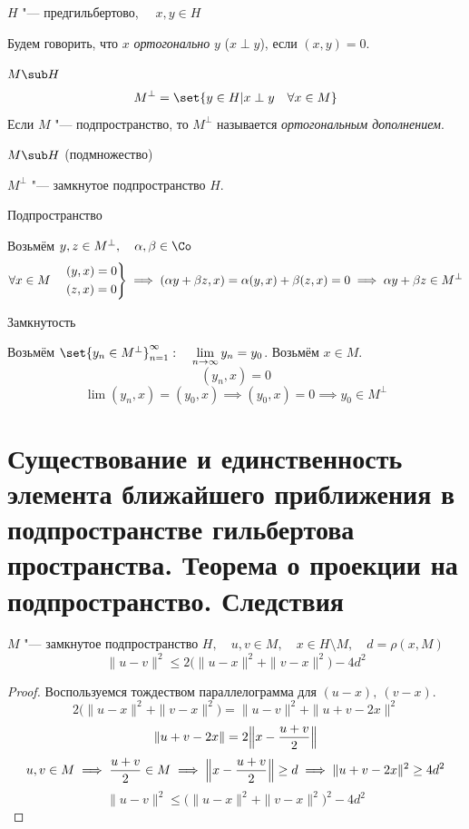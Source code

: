 \begin{definition}
	$ H $ "--- предгильбертово, $ \quad x, y \in H $

	Будем говорить, что $ x $ \emph{ортогонально} $ y $ ($ x \perp y $), если $ (x, y) = 0 $.
\end{definition}

\begin{definition}
	$ M \sub H $
	$$ M^\perp = \set{y \in H | x \perp y \quad \forall x \in M} $$
	Если $ M $ "--- подпространство, то $ M^\perp $ называется \emph{ортогональным
	дополнением}.
\end{definition}

\begin{statement}
	$ M \sub H $ (подмножество)

	$ M^\perp $ "--- замкнутое подпространство $ H $.
\end{statement}

\begin{iproof}
\item Подпространство

	Возьмём $ y, z \in M^\perp, \quad \alpha, \beta \in \Co $
	$$ \forall x \in M \quad
	\begin{rcases}
		(y, x) = 0 \\
		(z, x) = 0
	\end{rcases} \implies (\alpha y + \beta z, x) = \alpha(y, x) + \beta(z, x) = 0 \implies
	\alpha y + \beta z \in M^\perp $$
\item Замкнутость

	Возьмём $ \set{y_n \in M^\perp}_{n = 1}^\infty : \quad \lim\limits_{n \to \infty} y_n = y_0 $.
	Возьмём $ x \in M $.
	$$ (y_n, x) = 0 $$
	$$ \lim (y_n, x) = (y_0, x) \implies
	(y_0, x) = 0 \implies
	y_0 \in M^\perp $$
\end{iproof}

\section{Существование и единственность элемента ближайшего приближения в подпространстве
гильбертова пространства.
Теорема о проекции на подпространство.
Следствия}

\begin{lemma}
	$ M $ "--- замкнутое подпространство $ H, \quad
	u, v \in M, \quad x \in H \setminus M, \quad
	d = \rho(x, M) $
	$$ \|u - v\|^2 \le 2 \bigl( \|u - x\|^2 + \|v - x\|^2 \bigr) - 4d^2 $$
\end{lemma}

\begin{proof}
	Воспользуемся тождеством параллелограмма для $ (u - x), ~ (v - x) $.
	$$ 2 \bigl( \|u - x\|^2 + \|v - x\|^2 \bigr) =
	\|u - v\|^2 + \|u + v - 2x\|^2 $$
	$$ \|u + v - 2x\| = 2 \Bigl\|x - \frac{u + v}2 \Bigr\| $$
	$$ u, v \in M \implies \frac{u + v}2 \in M  \implies
	\Bigl\| x - \frac{u + v}2 \Bigr\| \ge d \implies
	\|u + v - 2x\|^2 \ge 4d^2 $$
	$$ \|u - v\|^2 \le \bigl( \|u - x\|^2 + \|v - x\|^2 \bigr)^2 - 4d^2 $$
\end{proof}

